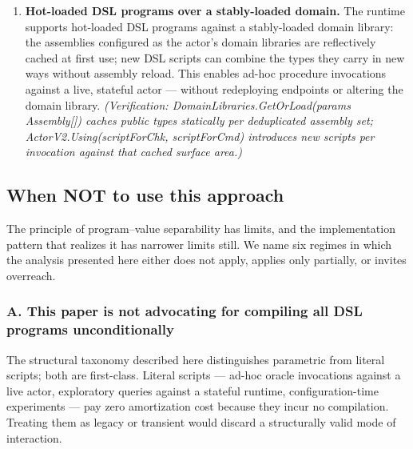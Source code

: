 \documentclass[
]{article}
\let\origtexttt\texttt%
\renewcommand{\texttt}[1]{\origtexttt{\seqsplit{#1}}}%
\let\texttt\origtexttt%
\begin{document}
\begin{enumerate}
{  static closure (β/α ≈ 2.7×); Grzybek's \texttt{SubscriptionPayment}
  verb dispatches α = 2 with a 73-method static closure (β/α ≈ 36×). α
  is exact; β is a crude static lower bound on reachable host surface
  (§5.5), and at n=2 the 2.7×-vs-36× gap is not attributable to any
  single cause. The supported claim is the qualitative one --- the
  persisted token is far smaller than the behavior it names --- carried
  by α and by journal density (§5.4), not by the β/α magnitude.)}
\item
  \textbf{Hot-loaded DSL programs over a stably-loaded domain.} The
  runtime supports hot-loaded DSL programs against a stably-loaded
  domain library: the assemblies configured as the actor's domain
  libraries are reflectively cached at first use; new DSL scripts can
  combine the types they carry in new ways without assembly reload. This
  enables ad-hoc procedure invocations against a live, stateful actor
  --- without redeploying endpoints or altering the domain library.
  \emph{(Verification: DomainLibraries.GetOrLoad(params Assembly{[}{]})
  caches public types statically per deduplicated assembly set;
  ActorV2.Using(scriptForChk, scriptForCmd) introduces new scripts per
  invocation against that cached surface area.)}
\end{enumerate}

\subsection{When NOT to use this
approach}\label{when-not-to-use-this-approach}

The principle of program--value separability has limits, and the
implementation pattern that realizes it has narrower limits still. We
name six regimes in which the analysis presented here either does not
apply, applies only partially, or invites overreach.

\subsubsection{A. This paper is not advocating for compiling all DSL
programs
unconditionally}\label{a.-this-paper-is-not-advocating-for-compiling-all-dsl-programs-unconditionally}

The structural taxonomy described here distinguishes parametric from
literal scripts; both are first-class. Literal scripts --- ad-hoc oracle
invocations against a live actor, exploratory queries against a stateful
runtime, configuration-time experiments --- pay zero amortization cost
because they incur no compilation. Treating them as legacy or transient
would discard a structurally valid mode of interaction.
\end{document}
